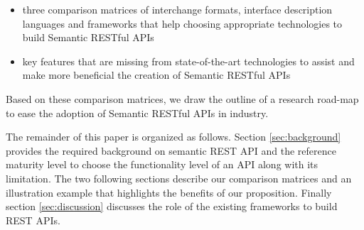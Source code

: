 \begin{itemize}
    \item three comparison matrices of interchange formats, interface description languages and frameworks that help choosing appropriate technologies to build Semantic RESTful APIs
    \item key features that are missing from state-of-the-art technologies to assist and make more beneficial the creation of Semantic RESTful APIs
\end{itemize}

Based on these comparison matrices, we draw the outline of a research road-map to ease the adoption of Semantic RESTful APIs in industry.

The remainder of this paper is organized as follows. Section \ref{sec:background} provides the required background on semantic REST API and the reference maturity level to choose the functionality level of an API along with its limitation. The two following sections describe our comparison matrices and an illustration example that highlights the benefits of our proposition. Finally section \ref{sec:discussion} discusses the role of the existing frameworks to build REST APIs. 
